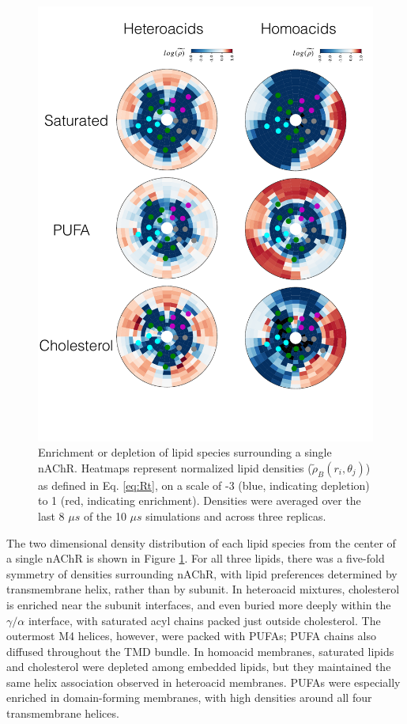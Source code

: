 \begin{figure}[htp]
\includegraphics[width=\textwidth]{figure/Figure5.pdf}
\caption[Enrichment or depletion of lipid species surrounding a single nAChR.] {Enrichment or depletion of lipid species surrounding a single nAChR. Heatmaps represent normalized lipid densities ($\tilde{\rho}_{B}(r_i,\theta_j)$) as defined in Eq. \ref{eq:Rt}, on a scale of -3 (blue, indicating depletion) to 1 (red, indicating enrichment). Densities were averaged over the last 8 $\mu s$ of the 10 $\mu s$ simulations and across three replicas.}
\label{fig:Fig2c}
\end{figure}


The two dimensional density distribution of each lipid species from the center of a single nAChR is shown in Figure \ref{fig:Fig2c}. For all three lipids, there was a five-fold symmetry of densities surrounding nAChR, with lipid preferences determined by transmembrane helix, rather than by subunit. In heteroacid mixtures, cholesterol is enriched near the subunit interfaces, and even buried more deeply within the $\gamma/\alpha$ interface, with saturated acyl chains packed just outside cholesterol.  The outermost M4 helices, however, were packed with PUFAs; PUFA chains also diffused throughout the TMD bundle.  In homoacid membranes, saturated lipids and cholesterol were depleted among embedded lipids, but they maintained the same helix association observed in heteroacid membranes. PUFAs were especially enriched in domain-forming membranes, with high densities around all four transmembrane helices. 

